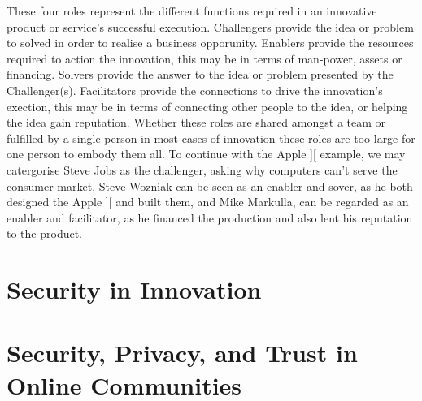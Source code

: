 These four roles represent the different functions required in an innovative product or service's successful execution. Challengers provide the idea or problem to solved in order to realise a business opporunity. Enablers provide the resources required to action the innovation, this may be in terms of man-power, assets or financing. Solvers provide the answer to the idea or problem presented by the Challenger(s). Facilitators provide the connections to drive the innovation's exection, this may be in terms of connecting other people to the idea, or helping the idea gain reputation. Whether these roles are shared amongst a team or fulfilled by a single person in most cases of innovation these roles are too large for one person to embody them all. To continue with the Apple ][ example, we may catergorise Steve Jobs as the challenger, asking why computers can't serve the consumer market, Steve Wozniak can be seen as an enabler and sover, as he both designed the Apple ][ and built them, and Mike Markulla, can be regarded as an enabler and facilitator, as he financed the production and also lent his reputation to the product. 

\section{Security in Innovation}

\section{Security, Privacy, and Trust in Online Communities}

